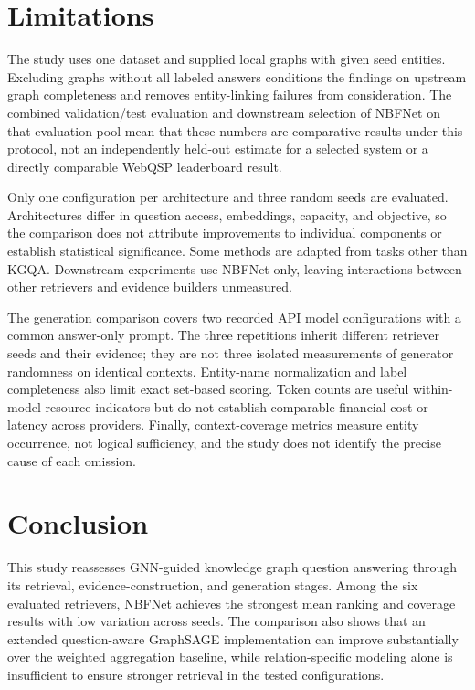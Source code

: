 \documentclass[10pt]{article}
\begin{document}
\section{Limitations}
\label{sec:limitations}

The study uses one dataset and supplied local graphs with given seed entities. Excluding graphs without all labeled answers conditions the findings on upstream graph completeness and removes entity-linking failures from consideration. The combined validation/test evaluation and downstream selection of NBFNet on that evaluation pool mean that these numbers are comparative results under this protocol, not an independently held-out estimate for a selected system or a directly comparable WebQSP leaderboard result.

Only one configuration per architecture and three random seeds are evaluated. Architectures differ in question access, embeddings, capacity, and objective, so the comparison does not attribute improvements to individual components or establish statistical significance. Some methods are adapted from tasks other than KGQA. Downstream experiments use NBFNet only, leaving interactions between other retrievers and evidence builders unmeasured.

The generation comparison covers two recorded API model configurations with a common answer-only prompt. The three repetitions inherit different retriever seeds and their evidence; they are not three isolated measurements of generator randomness on identical contexts. Entity-name normalization and label completeness also limit exact set-based scoring. Token counts are useful within-model resource indicators but do not establish comparable financial cost or latency across providers. Finally, context-coverage metrics measure entity occurrence, not logical sufficiency, and the study does not identify the precise cause of each omission.

\section{Conclusion}
\label{sec:conclusion}

This study reassesses GNN-guided knowledge graph question answering through its retrieval, evidence-construction, and generation stages. Among the six evaluated retrievers, NBFNet achieves the strongest mean ranking and coverage results with low variation across seeds. The comparison also shows that an extended question-aware GraphSAGE implementation can improve substantially over the weighted aggregation baseline, while relation-specific modeling alone is insufficient to ensure stronger retrieval in the tested configurations.
\end{document}
